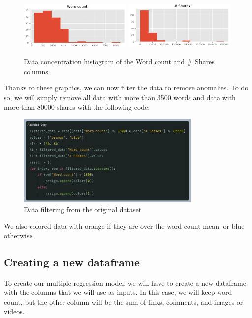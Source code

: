 \documentclass[10pt]{article}
\begin{document}
\begin{figure}[h]
  \centering
  \includegraphics[width=55mm]{images/2025-03-25-10-49-04}
  \includegraphics[width=55mm]{images/2025-03-25-10-49-28}
  \caption{Data concentration histogram of the Word count and \# Shares columns.}
\end{figure}

Thanks to these graphics, we can now filter the data to remove anomalies. To do so, we will simply remove all data with more than 3500 words and data with more than 80000 shares with the following code: \par

\begin{figure}[h]
  \centering
  \includegraphics[width=90mm]{images/2025-03-25-11-02-42}
  \caption{Data filtering from the original dataset}
\end{figure}

We also colored data with orange if they are over the word count mean, or blue otherwise.

\subsection{Creating a new dataframe}
To create our multiple regression model, we will have to create a new dataframe with the columns that we will use as inputs. In this case, we will keep word count, but the other column will be the sum of links, comments, and images or videos. \par
\end{document}
